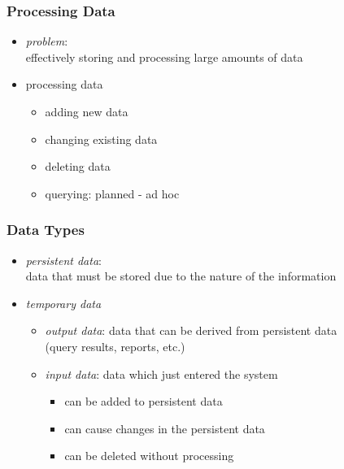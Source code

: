 \documentclass[dvipsnames]{beamer}
\theoremstyle{plain}
\begin{document}
\begin{frame}
  \frametitle{Processing Data}

  \begin{itemize}
    \item \emph{problem}:\\
      effectively storing and processing large amounts of data

    \pause
    \medskip
    \item processing data
    \begin{itemize}
      \item adding new data
      \item changing existing data
      \item deleting data
      \item querying: planned - ad hoc
    \end{itemize}
  \end{itemize}
\end{frame}

\begin{frame}
  \frametitle{Data Types}

  \begin{itemize}
    \item \emph{persistent data}:\\
      data that must be stored due to the nature of the information

    \pause
    \bigskip
    \item \emph{temporary data}
    \begin{itemize}
      \item \emph{output data}: data that can be derived from persistent data\\
        (query results, reports, etc.)

      \pause
      \medskip
      \item \emph{input data}: data which just entered the system
      \begin{itemize}
        \item can be added to persistent data
        \item can cause changes in the persistent data
        \item can be deleted without processing
      \end{itemize}
    \end{itemize}
  \end{itemize}
\end{frame}
\end{document}
